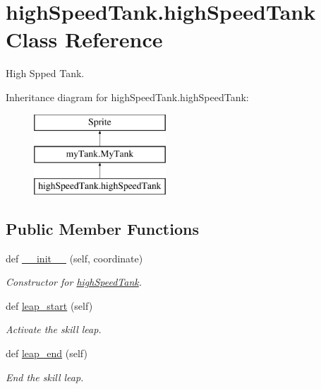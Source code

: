 \hypertarget{classhigh_speed_tank_1_1high_speed_tank}{}\section{high\+Speed\+Tank.\+high\+Speed\+Tank Class Reference}
\label{classhigh_speed_tank_1_1high_speed_tank}


High Spped Tank.  


Inheritance diagram for high\+Speed\+Tank.\+high\+Speed\+Tank\+:\begin{figure}[H]
\begin{center}
\leavevmode
\includegraphics[height=3.000000cm]{classhigh_speed_tank_1_1high_speed_tank}
\end{center}
\end{figure}
\subsection*{Public Member Functions}
\begin{DoxyCompactItemize}
\item 
def \mbox{\hyperlink{classhigh_speed_tank_1_1high_speed_tank_a43291c342249322293d1c8de585f6923}{\+\_\+\+\_\+init\+\_\+\+\_\+}} (self, coordinate)
\begin{DoxyCompactList}\small\item\em Constructor for \mbox{\hyperlink{classhigh_speed_tank_1_1high_speed_tank}{high\+Speed\+Tank}}. \end{DoxyCompactList}\item 
def \mbox{\hyperlink{classhigh_speed_tank_1_1high_speed_tank_a3f0a53a666dc3c0ae1334fc919ec8c50}{leap\+\_\+start}} (self)
\begin{DoxyCompactList}\small\item\em Activate the skill leap. \end{DoxyCompactList}\item 
def \mbox{\hyperlink{classhigh_speed_tank_1_1high_speed_tank_a36c678c940bfed5e3bcd3a58332775a2}{leap\+\_\+end}} (self)
\begin{DoxyCompactList}\small\item\em End the skill leap. \end{DoxyCompactList}\end{DoxyCompactItemize}

